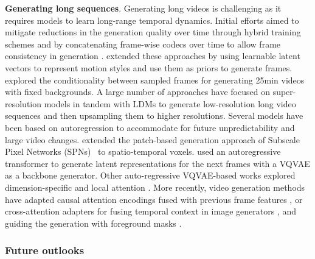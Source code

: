 \noindent
\textbf{Generating long sequences}. Generating long videos is challenging as it requires models to learn long-range temporal dynamics. Initial efforts aimed to mitigate reductions in the generation quality over time through hybrid training schemes \citep{brooks2022generating} and by concatenating frame-wise codecs over time to allow frame consistency in generation \citep{skorokhodov2022stylegan}. \citet{shen2023mostgan} extended these approaches by using learnable latent vectors to represent motion styles and use them as priors to generate frames. \citet{harvey2022flexible} explored the conditionality between sampled frames for generating 25min videos with fixed backgrounds. A large number of approaches \citep{ho2022imagen,singer2023make} have focused on super-resolution models in tandem with LDMs to generate low-resolution long video sequences and then upsampling them to higher resolutions. Several models have been based on autoregression to accommodate for future unpredictability and large video changes. \citet{weissenborn2020scaling} extended the patch-based generation approach of Subscale Pixel Networks (SPNs)~\citep{menick2019generating} to spatio-temporal voxels. \citet{ge2022long} used an autoregressive transformer to generate latent representations for the next frames with a VQVAE as a backbone generator. Other auto-regressive VQVAE-based works explored dimension-specific \citep{wu2021godiva} and local attention \citep{liang2022nuwa,wu2022nuwa}. More recently, video generation methods have adapted causal attention encodings fused with previous frame features \citep{yan2023temporally,villegas2022phenaki}, or cross-attention adapters for fusing temporal context in image generators \citep{long2024videodrafter}, and guiding the generation with foreground masks \citep{chang2024look}.




\subsubsection{Future outlooks}

